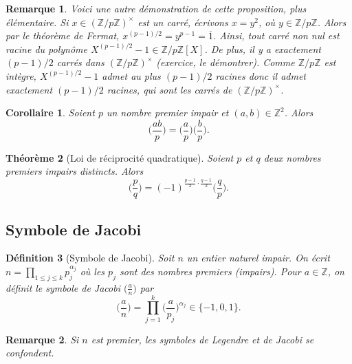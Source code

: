 \documentclass[12pt]{report}
\newtheorem{thm}{Théorème}[chapter]
\newtheorem*{rem}{Remarque}
\newtheorem{Def}[thm]{Définition}
\newtheorem{Cor}[thm]{Corollaire}
\newcommand{\Z}{\mathbb{Z}}
\begin{document}
\begin{rem}
Voici une autre démonstration de cette proposition, plus élémentaire. Si $x\in (\Z/p\Z)^\times$ est un carré, écrivons $x=y^2$, où $y\in \Z/p\Z$. Alors par le théorème de Fermat, $x^{(p-1)/2}=y^{p-1}=\overline{1}$. Ainsi, tout carré non nul est racine du polynôme $X^{(p-1)/2}-1\in \Z/p\Z[X]$. De plus, il y a exactement $(p-1)/2$ carrés dans $(\Z/p\Z)^\times$ (exercice, le démontrer). Comme $\Z/p\Z$ est intègre, $X^{(p-1)/2}-1$ admet au plus $(p-1)/2$ racines donc il admet exactement $(p-1)/2$ racines, qui sont les carrés de $(\Z/p\Z)^\times$.
\end{rem}

\begin{Cor}
Soient $p$ un nombre premier impair et $(a,b) \in \mathbb{Z}^2$. Alors 
$$  \Big( \frac{ab}{p} \Big)=  \Big( \frac{a}{p} \Big)\Big(  \frac{b}{p}\Big)  .  $$
\end{Cor}

\begin{thm}[Loi de réciprocité quadratique] Soient $p$ et $q$ deux nombres premiers impairs distincts. Alors
$$    \Big(  \frac{p}{q}\Big)=(-1)^{\tfrac{p-1}{2}\cdot \tfrac{q-1}{2}}\Big(  \frac{q}{p}\Big).   $$
\end{thm}


\subsection{Symbole de Jacobi}

\begin{Def}[Symbole de Jacobi]
Soit $n$ un entier naturel impair. On écrit $n=\prod_{1 \leq j \leq k}p_j^{\alpha_j}$ où les $p_j$ sont des nombres premiers (impairs). Pour $a \in \mathbb{Z}$, on définit le symbole de Jacobi $\big(  \tfrac{a}{n}\big)$ par
$$ \Big(  \frac{a}{n}\Big) =\prod_{j=1}^k \Big(  \frac{a}{p_j}\Big)^{\alpha_j} \in \{-1,0,1\} .  $$
\end{Def}

\begin{rem}
Si $n$ est premier, les symboles de Legendre et de Jacobi se confondent.
\end{rem}
\end{document}
